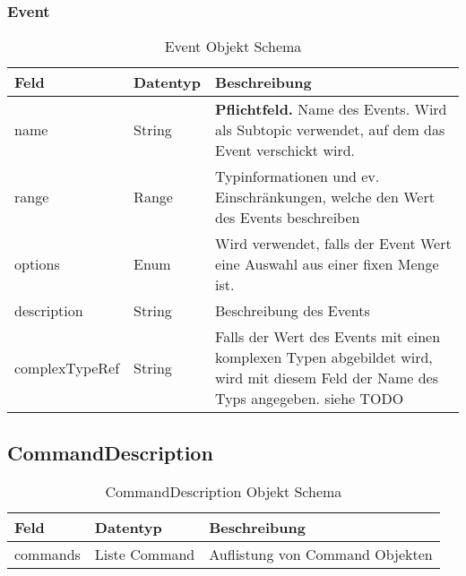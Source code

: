 \subsubsection{Event}
\begin{table}[H]
\begin{tabularx}{\textwidth}{|l|l|X|}

 \hline
 {\bf Feld } & {\bf Datentyp } & {\bf Beschreibung } \\  \hline
 
 name  &   String   &  \textbf{Pflichtfeld.} Name des Events. Wird als Subtopic verwendet, auf dem das Event verschickt wird. \\ \hline
 range  &   Range   &  Typinformationen und ev. Einschränkungen, welche den Wert des Events beschreiben   \\ \hline
 options  &   Enum   &  Wird verwendet, falls der Event Wert eine Auswahl aus einer fixen Menge ist.  \\ \hline
 description  &   String   &  Beschreibung des Events  \\ \hline
 complexTypeRef  &   String   &  Falls der Wert des Events mit einen komplexen Typen abgebildet wird, wird mit diesem Feld der Name des Typs angegeben. siehe TODO  \\ \hline

\end{tabularx}
\caption{Event Objekt Schema}
\end{table}



\subsection{CommandDescription}
\begin{table}[H]
\begin{tabularx}{\textwidth}{|l|l|X|}

 \hline
 {\bf Feld } & {\bf Datentyp } & {\bf Beschreibung } \\  \hline
 commands  &   Liste Command   & Auflistung von Command Objekten   \\ \hline

\end{tabularx}
\caption{CommandDescription Objekt Schema}
\end{table}



